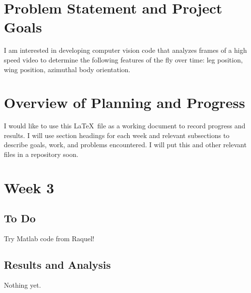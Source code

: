 \documentclass[12pt]{amsart}
\begin{document}
\section*{Problem Statement and Project Goals}

I am interested in developing computer vision code that analyzes frames of a high speed video to determine the following features of the fly over time: leg position, wing position, azimuthal body orientation.


\section*{Overview of Planning and Progress}
I would like to use this \LaTeX\ file as a working document to record progress and results. I will use section headings for each week and relevant subsections to describe goals, work, and problems encountered. I will put this and other relevant files in a repository soon.

\section*{Week 3}
\subsection*{To Do}
Try Matlab code from Raquel!
\subsection*{Results and Analysis}
Nothing yet.



\end{document}
